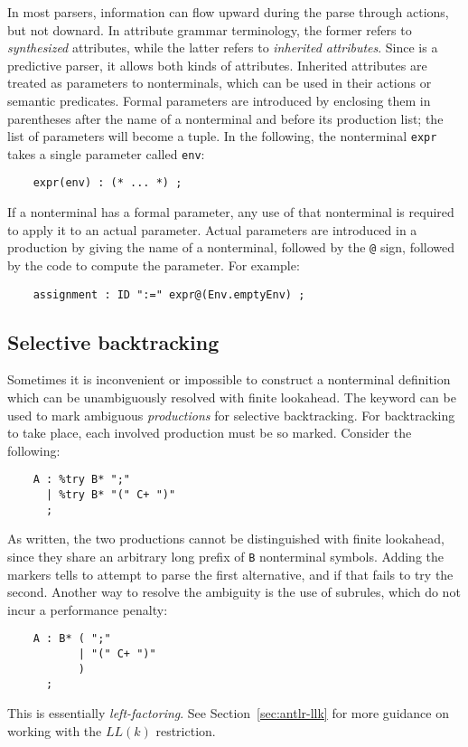 In most parsers, information can flow upward during the parse through actions, but not downard.  In attribute grammar terminology, the former refers to \emph{synthesized} attributes, while the latter refers to \emph{inherited attributes}.  Since \antlr{} is a predictive parser, it allows both kinds of attributes.  Inherited attributes are treated as parameters to nonterminals, which can be used in their actions or semantic predicates.  Formal parameters are introduced by enclosing them in parentheses after the name of a nonterminal and before its production list; the list of parameters will become a tuple.  In the following, the nonterminal \texttt{expr} takes a single parameter called \texttt{env}:
\begin{verbatim}
    expr(env) : (* ... *) ;
\end{verbatim}
If a nonterminal has a formal parameter, any use of that nonterminal is required to apply it to an actual parameter.  Actual parameters are introduced in a production by giving the name of a nonterminal, followed by the \texttt{@} sign, followed by the code to compute the parameter.  For example:
\begin{verbatim}
    assignment : ID ":=" expr@(Env.emptyEnv) ;
\end{verbatim}

\subsection{Selective backtracking}

Sometimes it is inconvenient or impossible to construct a nonterminal definition which can be unambiguously resolved with finite lookahead.
The  keyword can be used to mark ambiguous \emph{productions} for selective backtracking.  For backtracking to take place, each involved production must be so marked.  Consider the following:
\begin{verbatim}
    A : %try B* ";"
      | %try B* "(" C+ ")"
      ;
\end{verbatim}
As written, the two productions cannot be distinguished with finite lookahead, since they share an arbitrary long prefix of \texttt{B} nonterminal symbols.  Adding the  markers tells \antlr{} to attempt to parse the first alternative, and if that fails to try the second.  Another way to resolve the ambiguity is the use of subrules, which do not incur a performance penalty:
\begin{verbatim}
    A : B* ( ";"
           | "(" C+ ")"
           )
      ;
\end{verbatim}
This is essentially \emph{left-factoring}. See Section~\ref{sec:antlr-llk} for more guidance on working with the $LL(k)$ restriction.

